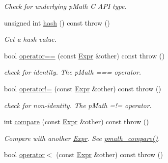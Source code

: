 \begin{CompactItemize}
\begin{CompactList}\small\item\em Check for underlying pMath C API type. \item\end{CompactList}\item 
\hypertarget{classpmath_1_1_expr_c9d1c162d3fb9070d2613e8778a7a77b}{
unsigned int \hyperlink{classpmath_1_1_expr_c9d1c162d3fb9070d2613e8778a7a77b}{hash} () const   throw ()}
\label{classpmath_1_1_expr_c9d1c162d3fb9070d2613e8778a7a77b}

\begin{CompactList}\small\item\em Get a hash value. \item\end{CompactList}\item 
\hypertarget{classpmath_1_1_expr_4400c28fc40ae423095d71ba694cd0de}{
bool \hyperlink{classpmath_1_1_expr_4400c28fc40ae423095d71ba694cd0de}{operator==} (const \hyperlink{classpmath_1_1_expr}{Expr} \&other) const   throw ()}
\label{classpmath_1_1_expr_4400c28fc40ae423095d71ba694cd0de}

\begin{CompactList}\small\item\em check for identity. The pMath === operator. \item\end{CompactList}\item 
\hypertarget{classpmath_1_1_expr_783a0634b0f7607a19ac6b14abe11fa5}{
bool \hyperlink{classpmath_1_1_expr_783a0634b0f7607a19ac6b14abe11fa5}{operator!=} (const \hyperlink{classpmath_1_1_expr}{Expr} \&other) const   throw ()}
\label{classpmath_1_1_expr_783a0634b0f7607a19ac6b14abe11fa5}

\begin{CompactList}\small\item\em check for non-identity. The pMath =!= operator. \item\end{CompactList}\item 
\hypertarget{classpmath_1_1_expr_6331d6d841117e3bdc509538b101fa26}{
int \hyperlink{classpmath_1_1_expr_6331d6d841117e3bdc509538b101fa26}{compare} (const \hyperlink{classpmath_1_1_expr}{Expr} \&other) const   throw ()}
\label{classpmath_1_1_expr_6331d6d841117e3bdc509538b101fa26}

\begin{CompactList}\small\item\em Compare with another \hyperlink{classpmath_1_1_expr}{Expr}. See \hyperlink{group__objects_gc57589e08f5b3eed28e724c646503735}{pmath\_\-compare()}. \item\end{CompactList}\item 
\hypertarget{classpmath_1_1_expr_260d8f5a63719b82571318ca1d4b2963}{
bool \hyperlink{classpmath_1_1_expr_260d8f5a63719b82571318ca1d4b2963}{operator$<$} (const \hyperlink{classpmath_1_1_expr}{Expr} \&other) const   throw ()}
\label{classpmath_1_1_expr_260d8f5a63719b82571318ca1d4b2963}


\end{CompactItemize}
